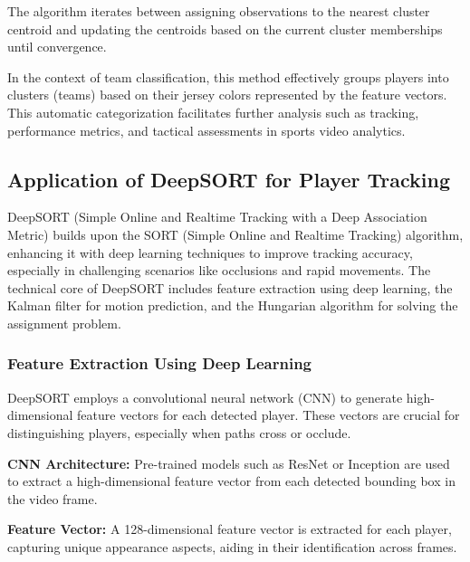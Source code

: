 \documentclass[12pt, letterpaper]{article}
\begin{document}
{\begin{spacing}{1.2}

The algorithm iterates between assigning observations to the nearest cluster centroid and updating the centroids based on the current cluster memberships until convergence.

In the context of team classification, this method effectively groups players into clusters (teams) based on their jersey colors represented by the feature vectors. This automatic categorization facilitates further analysis such as tracking, performance metrics, and tactical assessments in sports video analytics.


\end{spacing}
}


{
\setlength{\parskip}{0.3cm}
\subsection{Application of DeepSORT for Player Tracking}
\begin{spacing}{1.2}

DeepSORT (Simple Online and Realtime Tracking with a Deep Association Metric) builds upon the SORT (Simple Online and Realtime Tracking) algorithm, enhancing it with deep learning techniques to improve tracking accuracy, especially in challenging scenarios like occlusions and rapid movements. The technical core of DeepSORT includes feature extraction using deep learning, the Kalman filter for motion prediction, and the Hungarian algorithm for solving the assignment problem.


\subsubsection{Feature Extraction Using Deep Learning}

DeepSORT employs a convolutional neural network (CNN) to generate high-dimensional feature vectors for each detected player. These vectors are crucial for distinguishing players, especially when paths cross or occlude.

\textbf{CNN Architecture:} Pre-trained models such as ResNet or Inception are used to extract a high-dimensional feature vector from each detected bounding box in the video frame.

\textbf{Feature Vector:} A 128-dimensional feature vector is extracted for each player, capturing unique appearance aspects, aiding in their identification across frames.



\end{spacing}}
\end{document}
